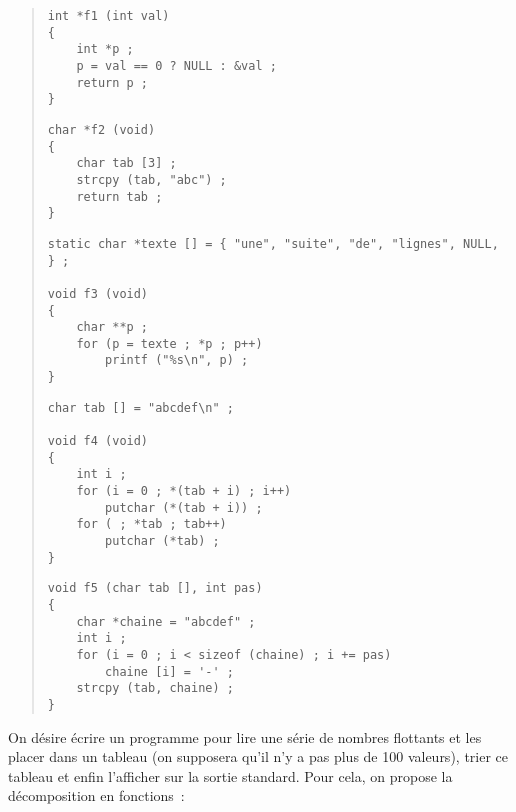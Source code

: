 \begin {quote}
    \small

\begin {verbatim}
int *f1 (int val)
{
    int *p ;
    p = val == 0 ? NULL : &val ;
    return p ;
}
\end{verbatim}

\begin {verbatim}
char *f2 (void)
{
    char tab [3] ;
    strcpy (tab, "abc") ;
    return tab ;
}
\end{verbatim}

\begin {verbatim}
static char *texte [] = { "une", "suite", "de", "lignes", NULL, } ;

void f3 (void)
{
    char **p ;
    for (p = texte ; *p ; p++)
        printf ("%
}
\end{verbatim}

\begin {verbatim}
char tab [] = "abcdef\n" ;

void f4 (void)
{
    int i ;
    for (i = 0 ; *(tab + i) ; i++)
        putchar (*(tab + i)) ;
    for ( ; *tab ; tab++)
        putchar (*tab) ;
}
\end{verbatim}


\begin {verbatim}
void f5 (char tab [], int pas)
{
    char *chaine = "abcdef" ;
    int i ;
    for (i = 0 ; i < sizeof (chaine) ; i += pas)
        chaine [i] = '-' ;
    strcpy (tab, chaine) ;
}
\end{verbatim}
\end {quote}


\question
    \label {sortfloat}

On désire écrire un programme pour lire une série de nombres flottants et
les placer dans un tableau (on supposera qu'il n'y a pas plus de 100
valeurs), trier ce tableau et enfin l'afficher sur la sortie standard.
Pour cela, on propose la décomposition en fonctions~:

